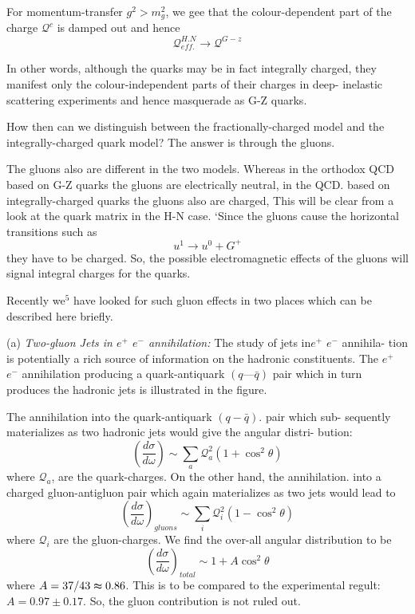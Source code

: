 For momentum-transfer $g^{2} > m^{2}_{g}$, we gee that the colour-dependent part of the charge $\mathcal{Q}^{c}$ is damped out and hence
$$
\mathcal{Q}^{H.N}_{eff.} \rightarrow \mathcal{Q}^{G-z}
$$ 

In other words, although the quarks may be in fact integrally charged, they manifest only the colour-independent parts of their charges in deep- inelastic scattering experiments and hence masquerade as G-Z quarks.

How then can we distinguish between the fractionally-charged model and the integrally-charged quark model? The answer is through the gluons. 

The gluons also are different in the two models. Whereas in the orthodox QCD based on G-Z quarks the gluons are electrically neutral, in the QCD. based on integrally-charged quarks the gluons also are charged, This will be clear from a look at the quark matrix in the H-N case. ‘Since the gluons cause the horizontal transitions such as 
$$
u^{1} \rightarrow u^{0} + G^{+}
$$
they have to be charged. So, the possible electromagnetic effects of the gluons will signal integral charges for the quarks. 

Recently we$^{5}$ have looked for such gluon effects in two places which can be described here briefly. 

(a) {\it Two-gluon Jets in $e^{+}$ $e^{-}$ annihilation:} The study of jets in$e^{+}$ $e^{-}$ annihila- tion is potentially a rich source of information on the hadronic constituents. The $e^{+}$ $e^{-}$ annihilation producing a quark-antiquark $(q — \bar{q})$ pair which in turn produces the hadronic jets is illustrated in the figure. 

The annihilation into the quark-antiquark $(q-\bar{q})$. pair which sub- sequently materializes as two hadronic jets would give the angular distri- bution: 
$$
\left(\frac{d \sigma}{d \omega}\right)\sim \sum_{a} \mathcal{Q}^{2}_{a} (1+ \cos^{2}\theta)
$$
where $\mathcal{Q}_{a}$, are the quark-charges. On the other hand, the annihilation. into a charged gluon-antigluon pair which again materializes as two jets would
lead to 
$$
\left(\frac{d \sigma}{d \omega} \right)_{gluons} \sim \sum_{i} \mathcal{Q}^{2}_{i}(1-\cos^{2}\theta)
$$
where $\mathcal{Q}_{i}$ are the gluon-charges. We find the over-all angular distribution to be 
$$
\left(\frac{d \sigma}{d \omega} \right)_{total} \sim 1 + A \cos^{2}\theta
$$
where $A=37/43  \thickapprox 0.86$. This is to be compared to the experimental regult: $A=0.97\pm 0.17$. So, the gluon contribution is not ruled out.

